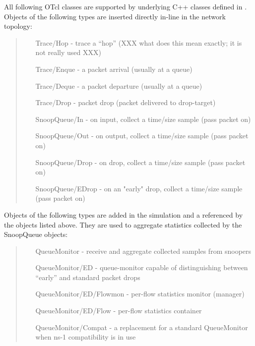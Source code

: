 All following OTcl classes are supported by underlying C++
classes defined in .
Objects of the following types are inserted directly in-line in the
network topology:
\begin{quote}
\begin{itemize}
	\item [Trace/Hop] - trace a ``hop'' (XXX what does this mean exactly; it is not really used XXX)
	\item [Trace/Enque] - a packet arrival (usually at a queue)
	\item [Trace/Deque] - a packet departure (usually at a queue)
	\item [Trace/Drop] - packet drop (packet delivered to drop-target)
	\item [SnoopQueue/In] - on input, collect a time/size sample (pass packet on)
	\item [SnoopQueue/Out] - on output, collect a time/size sample (pass packet on)
	\item [SnoopQueue/Drop] - on drop, collect a time/size sample (pass packet on)
	\item [SnoopQueue/EDrop] - on an "early" drop, collect a time/size sample (pass packet on)
\end{itemize}
\end{quote}
Objects of the following types are added in the simulation and a referenced
by the objects listed above.  They are used to aggregate statistics collected
by the SnoopQueue objects:
\begin{quote}
\begin{itemize}
	\item [QueueMonitor] - receive and aggregate collected samples from snoopers
	\item [QueueMonitor/ED] - queue-monitor capable of distinguishing between ``early'' and standard packet drops
	\item [QueueMonitor/ED/Flowmon] - per-flow statistics monitor (manager)
	\item [QueueMonitor/ED/Flow] - per-flow statistics container
	\item [QueueMonitor/Compat] - a replacement for a standard QueueMonitor when ns-1 compatibility is in use
\end{itemize}
\end{quote}

\subsubsection{}

